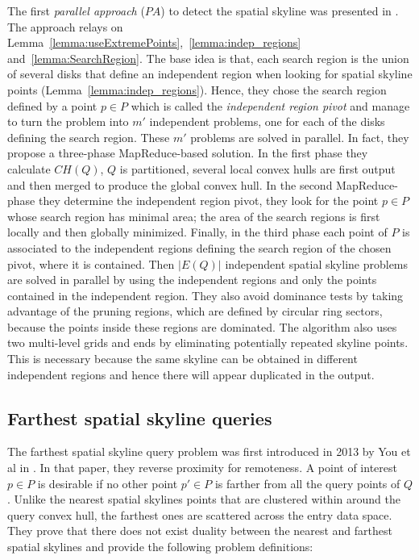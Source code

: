 \documentclass[11pt,onecolumn]{elsart3p}
\begin{document}

     The first {\it parallel approach} ($PA$) to detect the spatial skyline was presented in \cite{WZSK17}. The approach relays on Lemma~\ref{lemma:useExtremePoints},~\ref{lemma:indep_regions} and~\ref{lemma:SearchRegion}. The base idea is that, each search region is the union of several disks that define an independent region when looking for spatial skyline points (Lemma~\ref{lemma:indep_regions}). Hence, they chose the search region defined by a point $p\in P$ which is called the {\it independent region pivot} and manage to turn the problem into $m'$ independent problems, one for each of the disks defining the search region. These $m'$ problems are solved in parallel. In fact, they propose a three-phase MapReduce-based solution. In the first phase they calculate $CH(Q)$, $Q$ is partitioned, several local convex hulls are first output and then merged to produce the global convex hull. In the second MapReduce-phase they determine the independent region pivot, they look for the point $p\in P$ whose search region has minimal area; the area of the search regions is first locally and then globally minimized. Finally, in the third phase each point of $P$ is associated to the independent regions defining the search region of the chosen pivot, where it is contained. Then $|E(Q)|$ independent spatial skyline problems are solved in parallel by using the independent regions and only the points contained in the independent region. They also avoid dominance tests by taking advantage of the pruning regions, which are defined by circular ring sectors, because the points inside these regions are dominated. The algorithm also uses two multi-level grids and ends by eliminating potentially repeated skyline points. This is necessary because the same skyline can be obtained in different independent regions and hence there will appear duplicated in the output.


\subsection{Farthest spatial skyline queries}

The farthest spatial skyline query problem was first introduced in 2013 by You et al in \cite{YLIH13}. In that paper, they reverse proximity for remoteness. A point of interest $p\in P$ is desirable if no other point $p'\in P$ is farther from all the query points of $Q$. Unlike the nearest spatial skylines points that are clustered within around the query convex hull, the farthest ones are scattered across the entry data space. They prove that there does not exist duality between the nearest and farthest spatial skylines and provide the following problem definitions: \\
\end{document}
